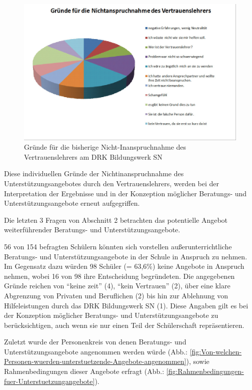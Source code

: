 \begin{figure}[ht]
	\centering
		\includegraphics[width=1.0\textwidth]{images/Gruende-fuer-die-Nichtinaspruchnahme-des-Vertrauenslehrers.png}
	\caption{Gründe für die bisherige Nicht-Inanspruchnahme des Vertrauenslehrers am DRK Bildungswerk SN}
	\label{fig:Gruende-fuer-die-Nichtinaspruchnahme-des-Vertrauenslehrers}
\end{figure}

\noindent
Diese individuellen Gründe der Nichtinanspruchnahme des Unterstützungsangebotes durch den Vertrauenslehrers, werden bei der Interpretation der Ergebnisse und in der Konzeption möglicher Beratungs- und Unterstützungsangebote erneut aufgegriffen.

Die letzten 3 Fragen von Abschnitt 2 betrachten das potentielle Angebot weiterführender Beratungs- und Unterstützungsangebote. 

56 von 154 befragten Schülern könnten sich vorstellen außerunterrichtliche Beratungs- und Unterstützungsangebote in der Schule in Anspruch zu nehmen. Im Gegensatz dazu würden 98 Schüler (= 63,6\%) keine Angebote in Anspruch nehmen, wobei 16 von 98 ihre Entscheidung begründeten. Die angegebenen Gründe reichen von "`keine  zeit"' (4), "`kein Vertrauen"' (2), über eine klare Abgrenzung von Privaten und Beruflichen (2) bis hin zur Ablehnung von Hilfeleistungen durch das DRK Bildungswerk SN (1). Diese Angaben gilt es bei der Konzeption möglicher Beratungs- und Unterstützungsangebote zu berücksichtigen, auch wenn sie nur einen Teil der Schülerschaft repräsentieren.

Zuletzt wurde der Personenkreis von denen Beratungs- und Unterstützungsangebote angenommen werden würde (Abb.: \ref{fig:Von-welchen-Personen-wuerden-unterstuetzende-Angebote-angenommen}), sowie Rahmenbedingungen dieser Angebote erfragt (Abb.: \ref{fig:Rahmenbedingungen-fuer-Unterstuetzungangebote}). 

